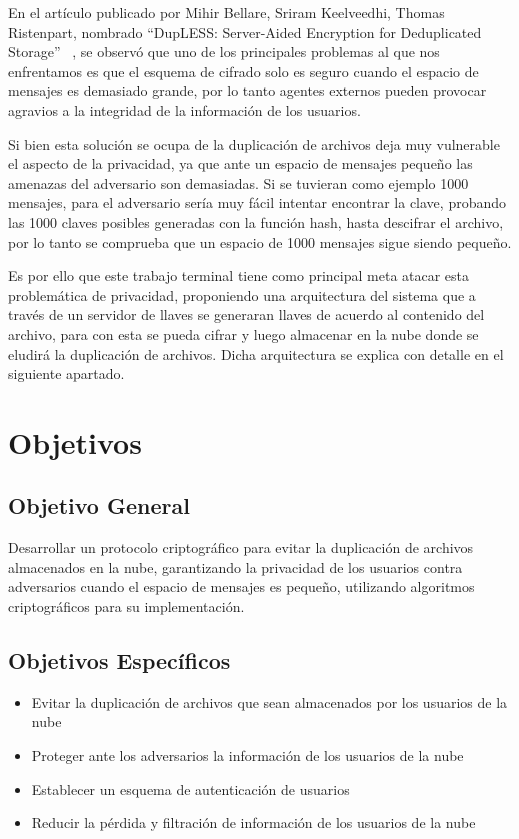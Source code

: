 En el artículo publicado por Mihir Bellare, Sriram Keelveedhi, Thomas Ristenpart, nombrado “DupLESS: Server-Aided Encryption for Deduplicated Storage” ~\cite{Bellare}, se observó que uno de los principales problemas al que nos enfrentamos es que el esquema de cifrado solo es seguro cuando el espacio de mensajes es demasiado grande, por lo tanto agentes externos pueden provocar agravios a la integridad de la información de los usuarios.

Si bien esta solución se ocupa de la duplicación de archivos deja muy vulnerable el aspecto de la privacidad, ya que ante un espacio de mensajes pequeño las amenazas del adversario son demasiadas. Si se tuvieran como ejemplo 1000 mensajes, para el adversario sería muy fácil intentar encontrar la clave, probando las 1000 claves posibles generadas con la función hash, hasta descifrar el archivo, por lo tanto se comprueba que un espacio de 1000 mensajes sigue siendo pequeño.

Es por ello que este trabajo terminal tiene como principal meta atacar esta problemática de privacidad, proponiendo una arquitectura del sistema que a través de un servidor de llaves se generaran llaves de acuerdo al contenido del archivo, para con esta se pueda cifrar y luego almacenar en la nube donde se eludirá la duplicación de archivos. Dicha arquitectura se explica con detalle en el siguiente apartado.

\section{Objetivos} %

    \subsection{Objetivo General} %
    Desarrollar un protocolo criptográfico para evitar la duplicación de archivos almacenados en la nube, garantizando la privacidad de los usuarios contra adversarios cuando el espacio de mensajes es pequeño, utilizando algoritmos criptográficos para su implementación. 
     
    \subsection{Objetivos Específicos} %
	\begin{itemize}
		\item Evitar la duplicación de archivos que sean almacenados por los usuarios de la nube
		\item Proteger ante los adversarios la información de los usuarios de la nube
		\item Establecer un esquema de autenticación de usuarios 
		\item Reducir la pérdida y filtración de información de los usuarios de la nube
 	\end{itemize}
    